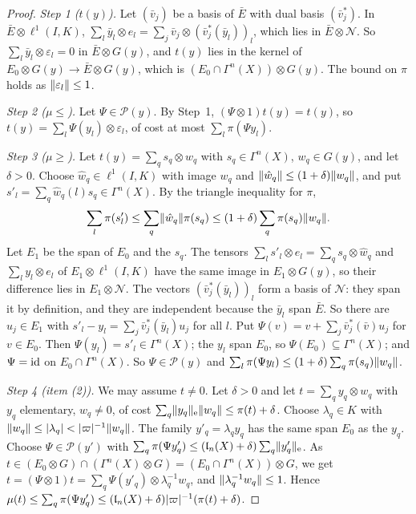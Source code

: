 \begin{proof}
\emph{Step 1 ($t(y)$).} Let $(\bar v_j)$ be a basis of $\bar E$ with dual basis $(\bar v_j^*)$. In $\bar E\otimes\ell^1(I,K)$, $\sum_l\bar y_l\otimes e_l=\sum_j\bar v_j\otimes(\bar v_j^*(\bar y_l))_l$, which lies in $\bar E\otimes\mathcal N$. So $\sum_l\bar y_l\otimes\varepsilon_l=0$ in $\bar E\otimes G(y)$, and $t(y)$ lies in the kernel of $E_0\otimes G(y)\to\bar E\otimes G(y)$, which is $(E_0\cap\Gamma^n(X))\otimes G(y)$. The bound on $\pi$ holds as $\lVert \varepsilon_l\rVert\le1$.

\emph{Step 2 ($\mu\le$).} Let $\Psi\in\mathcal P(y)$. By Step~1, $(\Psi\otimes1)t(y)=t(y)$, so $t(y)=\sum_l\Psi(y_l)\otimes\varepsilon_l$, of cost at most $\sum_l\pi(\Psi y_l)$.

\emph{Step 3 ($\mu\ge$).} Let $t(y)=\sum_qs_q\otimes w_q$ with $s_q\in\Gamma^n(X)$, $w_q\in G(y)$, and let $\delta>0$. Choose $\hat w_q\in\ell^1(I,K)$ with image $w_q$ and $\lVert \hat w_q\rVert\le(1+\delta)\lVert w_q\rVert$, and put $s'_l=\sum_q\hat w_q(l)s_q\in\Gamma^n(X)$. By the triangle inequality for $\pi$,
\[
 \sum_l\pi(s'_l)\le\sum_q\lVert \hat w_q\rVert\pi(s_q)\le(1+\delta)\sum_q\pi(s_q)\lVert w_q\rVert.
\]
Let $E_1$ be the span of $E_0$ and the $s_q$. The tensors $\sum_ls'_l\otimes e_l=\sum_qs_q\otimes\hat w_q$ and $\sum_ly_l\otimes e_l$ of $E_1\otimes\ell^1(I,K)$ have the same image in $E_1\otimes G(y)$, so their difference lies in $E_1\otimes\mathcal N$. The vectors $(\bar v_j^*(\bar y_l))_l$ form a basis of $\mathcal N$: they span it by definition, and they are independent because the $\bar y_l$ span $\bar E$. So there are $u_j\in E_1$ with $s'_l-y_l=\sum_j\bar v_j^*(\bar y_l)u_j$ for all $l$. Put $\Psi(v)=v+\sum_j\bar v_j^*(\bar v)u_j$ for $v\in E_0$. Then $\Psi(y_l)=s'_l\in\Gamma^n(X)$; the $y_l$ span $E_0$, so $\Psi(E_0)\subseteq\Gamma^n(X)$; and $\Psi=\mathrm{id}$ on $E_0\cap\Gamma^n(X)$. So $\Psi\in\mathcal P(y)$ and $\sum_l\pi(\Psi y_l)\le(1+\delta)\sum_q\pi(s_q)\lVert w_q\rVert$.

\emph{Step 4 (item (2)).} We may assume $t\ne0$. Let $\delta>0$ and let $t=\sum_qy_q\otimes w_q$ with $y_q$ elementary, $w_q\ne0$, of cost $\sum_q\lVert y_q\rVert_{\rm e}\lVert w_q\rVert\le\pi(t)+\delta$. Choose $\lambda_q\in K$ with $\lVert w_q\rVert\le\lvert \lambda_q\rvert<\lvert \varpi\rvert^{-1}\lVert w_q\rVert$. The family $y'_q=\lambda_qy_q$ has the same span $E_0$ as the $y_q$. Choose $\Psi\in\mathcal P(y')$ with $\sum_q\pi(\Psi y'_q)\le(\mathfrak l_n(X)+\delta)\sum_q\lVert y'_q\rVert_{\rm e}$. As $t\in(E_0\otimes G)\cap(\Gamma^n(X)\otimes G)=(E_0\cap\Gamma^n(X))\otimes G$, we get $t=(\Psi\otimes1)t=\sum_q\Psi(y'_q)\otimes\lambda_q^{-1}w_q$, and $\lVert \lambda_q^{-1}w_q\rVert\le1$. Hence $\mu(t)\le\sum_q\pi(\Psi y'_q)\le(\mathfrak l_n(X)+\delta)\lvert \varpi\rvert^{-1}(\pi(t)+\delta)$.
\end{proof}


